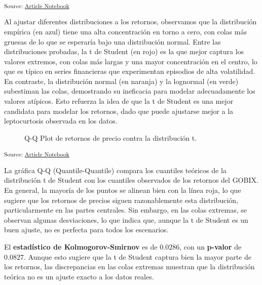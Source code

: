 \documentclass[
  number,
  preprint,
  3p,
  onecolumn]{elsarticle}
\begin{document}
\textsubscript{Source:
\href{https://iancont.github.io/fixed_income_garch/index-preview.html}{Article
Notebook}}

Al ajustar diferentes distribuciones a los retornos, observamos que la
distribución empírica (en azul) tiene una alta concentración en torno a
cero, con colas más gruesas de lo que se esperaría bajo una distribución
normal. Entre las distribuciones probadas, la t de Student (en rojo) es
la que mejor captura los valores extremos, con colas más largas y una
mayor concentración en el centro, lo que es típico en series financieras
que experimentan episodios de alta volatilidad. En contraste, la
distribución normal (en naranja) y la lognormal (en verde) subestiman
las colas, demostrando su ineficacia para modelar adecuadamente los
valores atípicos. Esto refuerza la idea de que la t de Student es una
mejor candidata para modelar los retornos, dado que puede ajustarse
mejor a la leptocurtosis observada en los datos.

\begin{figure}[H]


\caption{\label{fig-tqq-plot}Q-Q Plot de retornos de precio contra la
distribución t.}

\end{figure}%

\textsubscript{Source:
\href{https://iancont.github.io/fixed_income_garch/index-preview.html}{Article
Notebook}}

La gráfica Q-Q (Quantile-Quantile) compara los cuantiles teóricos de la
distribución t de Student con los cuantiles observados de los retornos
del GOBIX. En general, la mayoría de los puntos se alinean bien con la
línea roja, lo que sugiere que los retornos de precios siguen
razonablemente esta distribución, particularmente en las partes
centrales. Sin embargo, en las colas extremas, se observan algunas
desviaciones, lo que indica que, aunque la t de Student es un buen
ajuste, no es perfecta para todos los escenarios.

El \textbf{estadístico de Kolmogorov-Smirnov} es de \(0.0286\), con un
\textbf{p-valor} de \(0.0827\). Aunque esto sugiere que la t de Student
captura bien la mayor parte de los retornos, las discrepancias en las
colas extremas muestran que la distribución teórica no es un ajuste
exacto a los datos reales.
\end{document}
